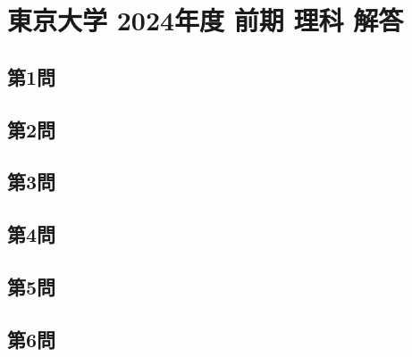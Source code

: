 ﻿\documentclass[../../uem_mat_tok_a.tex]{subfiles}
\begin{document}
    \section{東京大学 2024年度 前期 理科 解答}

    \subsection{第1問}
    

    \clearpage
    \subsection{第2問}
    

    \clearpage
    \subsection{第3問}
    

    \clearpage
    \subsection{第4問}
    

    \clearpage
    \subsection{第5問}
    

    \clearpage
    \subsection{第6問}
    

    \clearpage
\end{document}
